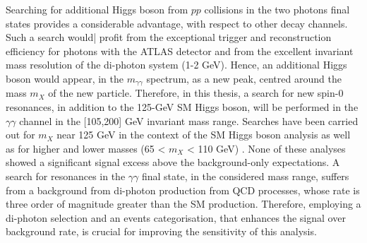 \documentclass[a4paper, oneside, 11pt, openright]{book}
\begin{document}
		Searching for additional Higgs boson from $pp$ collisions in the two photons final states provides a considerable advantage, with respect to other decay channels. Such a search would| profit from the exceptional trigger and reconstruction efficiency for photons with the ATLAS detector and from the excellent invariant mass resolution of the di-photon system (1-2 GeV). Hence, an additional Higgs boson would appear, in the $m_{\gamma\gamma}$ spectrum, as a new peak, centred around the mass $m_X$ of the new particle. Therefore, in this thesis, a search for new spin-0 resonances, in addition to the 125-GeV SM Higgs boson, will be performed in the $\gamma\gamma$ channel in the [105,200] GeV invariant mass range. Searches have been carried out for $m_X$ near 125 GeV in the context of the SM Higgs boson analysis \cite{Lanyov_2014} as well as for higher \cite{2021136651}\cite{2017105} and lower masses (65 < $m_X$ < 110 GeV) \cite{ATLAS-CONF-2018-025}. None of these analyses showed a significant signal excess above the background-only expectations. A search for resonances in the $\gamma\gamma$ final state, in the considered mass range, suffers from a background from di-photon production from QCD processes, whose rate is three order of magnitude greater than the SM production. Therefore, employing a di-photon selection and an events categorisation, that enhances the signal over background rate, is crucial for improving the sensitivity of this analysis.
		
\end{document}
